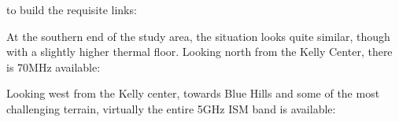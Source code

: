 to build the requisite links:
\begin{center}
\end{center}
At the southern end of the study area, the situation looks quite similar, though
with a slightly higher thermal floor. Looking north from the Kelly Center, there
is 70MHz available:
\begin{center}
\end{center}
Looking west from the Kelly center, towards Blue Hills and some of the most challenging terrain,
virtually the entire 5GHz ISM band is available:
\begin{center}
\end{center}
